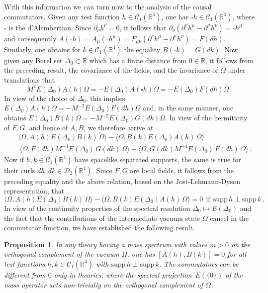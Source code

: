 \documentclass[11pt]{article}
\newtheorem{proposition}[theorem]{Proposition}
\numberwithin{equation}{section}
\newcommand{\RR}{{\mathbb R}}
\newcommand{\Cc}{{\mathcal{C}}}
\newcommand{\Dc}{{\mathcal{D}}}
\newcommand{\supp}{{\mathrm{supp}}}
\begin{document}
\medskip 
With this information we can turn now to the analysis of the
causal commutators. Given any 
test function $h \in \Cc_1(\RR^4)$, one has $\square h \in \Cc_1(\RR^4)$,
where $\square$ is the d'Alembertian. Since 
$\partial_\nu h^\nu = 0$, it follows that 
$\partial_\nu(\partial^\nu h^\mu - \partial^\mu h^\nu) = \square h^\mu$
and consequently $A(\square h) = A_\mu(\square h^\mu) =  
F_{\mu \nu}(\partial^\nu h^\mu - \partial^\mu h^\nu) = F(d h)$.
Similarly, one obtains for $k \in \Cc_1(\RR^4)$ the
equality $B(\square k) = 
G(d k)$. 
Now given any Borel set $\Delta_0 \subset \RR$ which has a finite
distance from $0 \in \RR$, it follows from the preceding 
result, the covariance of the fields,  and
the invariance of $\Omega$  under translations that 
$$
M^2 E(\Delta_0) A(h) \Omega = 
- E(\Delta_0) A(\square h) \Omega = - E(\Delta_0) F(d h) \Omega \, .
$$  
In view of the choice of $\Delta_0$, this implies 
$E(\Delta_0) A(h) \Omega = - M^{-2} E(\Delta_0) F(d h) \Omega$ 
and, in the same manner, one obtains 
$E(\Delta_0) B(k) \Omega = - M^{-2} E(\Delta_0) G(d k) \Omega$. 
In view of the hermiticity of $F,G$, and hence of $A,B$,  we 
therefore arrive at 
\begin{align*}
& \langle \Omega, A(h) E(\Delta_0) B(k) \, \Omega \rangle 
 - \langle \Omega, B(k) E(\Delta_0) A(h) \, \Omega \rangle  \\
= & \ \langle \Omega, F(dh) M^{-4} E(\Delta_0) \, G(dk) \, \Omega \rangle 
 - \langle \Omega, G(dk) M^{-4} E(\Delta_0) \, F(dh) \, \Omega \rangle \, .
\end{align*}
Now if $h,k \in \Cc_1(\RR^4)$ have spacelike separated supports, 
the same is true for their curls 
$d h, d k \in \Dc_2(\RR^4)$. Since $F,G$ are local fields, it 
follows from the preceding equality and the above 
relation, based on the 
Jost-Lehmann-Dyson representation, that 
$$
\langle \Omega, A(h) E(\Delta_0) B(k) \, \Omega \rangle 
 - \langle \Omega, B(k) E(\Delta_0) A(h) \, \Omega \rangle = 0 
\ \ \mbox{if} \ \ \supp \, h \perp \supp \, k \, . 
$$
In view of the continuity 
properties of the spectral resolution \mbox{$\Delta_0 \mapsto E(\Delta_0)$}  
and the fact that the contributions of the intermediate 
vacuum state $\Omega$ cancel in the commutator function, 
we have established the following result.
\begin{proposition}
In any theory having a mass spectrum
with values $m > 0$ on the orthogonal 
complement of the vacuum $\Omega$,
one has $[A(h), B(k)] = 0$ for all test functions
$h,k \in \Cc_1(\RR^4)$ with \mbox{$\supp \, h \perp \supp \, k$}. The 
commutators can be different from $0$ only in theories,  
where the spectral projection~$E(\{ 0 \})$ of the mass operator 
acts non-trivially on the orthogonal complement of $\Omega$. 
\end{proposition}
\end{document}
